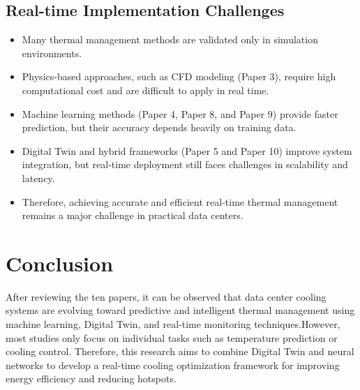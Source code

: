 \documentclass[12pt,a4paper]{article}
\begin{document}
    \subsection{Real-time Implementation Challenges}
                \begin{itemize}
                \item Many thermal management methods are validated only in simulation environments.
                
                \item Physics-based approaches, such as CFD modeling (Paper 3), require high computational cost and are difficult to apply in real time.
                
                \item Machine learning methods (Paper 4, Paper 8, and Paper 9) provide faster prediction, but their accuracy depends heavily on training data.
                
                \item Digital Twin and hybrid frameworks (Paper 5 and Paper 10) improve system integration, but real-time deployment still faces challenges in scalability and latency.
                
                \item Therefore, achieving accurate and efficient real-time thermal management remains a major challenge in practical data centers.
                \end{itemize}


\section{Conclusion}

    After reviewing the ten papers, it can be observed that data center cooling systems are evolving toward predictive and intelligent thermal management using machine learning, Digital Twin, and real-time monitoring techniques.However, most studies only focus on individual tasks such as temperature prediction or cooling control. Therefore, this research aims to combine Digital Twin and neural networks to develop a real-time cooling optimization framework for improving energy efficiency and reducing hotspots.
\end{document}
